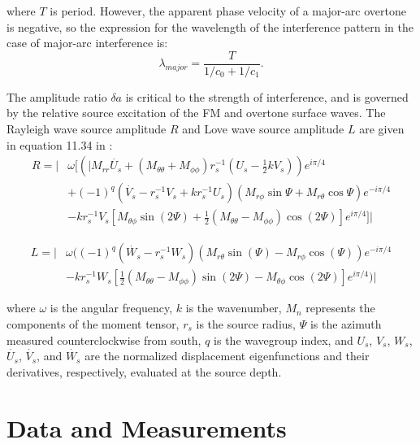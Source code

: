 \documentclass[extra,mreferee]{gji}
\begin{document}
where $T$ is period. However, the apparent phase velocity of a major-arc overtone is negative, so  the expression for the wavelength of the interference pattern in the case of major-arc interference is:
\begin{equation}
\lambda_{major} = \frac{T}{1/c_0+1/c_1}. 
\end{equation}

The amplitude ratio $\delta a$ is critical to the strength of interference, and is governed by the relative source excitation of the FM and overtone surface waves. The Rayleigh wave source amplitude $R$ and Love wave source amplitude $L$ are given in equation 11.34 in \cite{dahlen1998theoretical}:
\begin{equation}
 \begin{aligned}
 R = |{} & \omega[(|M_{rr} \dot{U_s} + (M_{\theta \theta} + M_{\phi \phi}) r_s^{-1}(U_s-\frac{1}{2} kV_s)) e^{i \pi/4}  \\ & + (-1)^q (\dot{V_s} - r^{-1}_s V_s + k r^{-1}_s U_s)(M_{r \phi} \sin \Psi + M_{r \theta} \cos \Psi) e^{-i \pi/4}  \\ & - k r^{-1}_s V_s[M_{\theta \phi} \sin(2 \Psi) + \frac{1}{2}(M_{\theta \theta}-M_{\phi \phi}) \cos(2 \Psi)] e^{i \pi/4}]|
 \end{aligned}
\end{equation} 

\begin{equation}
\begin{aligned}
L = |{} & \omega((-1)^q (\dot{W_s} - r^{-1}_s W_s)(M_{r\theta} \sin(\Psi) - M_{r \phi} \cos(\Psi)) e^{-i \pi/4}  \\
& - k r^{-1}_s W_s [\frac{1}{2} (M_{\theta \theta} - M_{\phi\phi}) \sin (2 \Psi) - M_{\theta \phi} \cos (2 \Psi)]e^{i \pi/4})|
\end{aligned}
\end{equation}

where $\omega$ is the angular frequency, $k$ is the wavenumber,  $M_n$ represents the components of the moment tensor, $r_s$ is the source radius, $\Psi$ is the azimuth measured counterclockwise from south, $q$ is the wavegroup index, and $U_s$, $V_s$, $W_s$, $\dot{U_s}$, $\dot{V_s}$, and $\dot{W_s}$ are the normalized displacement eigenfunctions and their derivatives, respectively, evaluated at the source depth.

\section{Data and Measurements}
\end{document}

